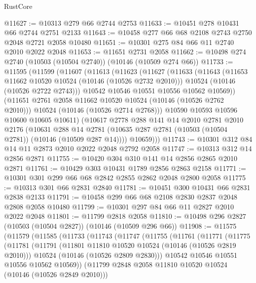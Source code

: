 \begin{lexlean}{RustCore}
\begin{coremodule}
@11627 := @10313 @279 @66 @2744 @2753
@11633 := @10451 @278 @10431 @66 @2744 @2751 @2133
@11643 := @10458 @277 @66 @68 @2108 @2743 @2750 @2048 @2721 @2058 @10480
@11651 := @10301 @275 @84 @66 @11 @2740 @2010 @2022 @2048
@11653 := @11651 @2731 @2058
@11662 := @10498 @274 @2740 (@10503 (@10504 @2740)) (@10146 (@10509 @274 @66))
@11733 := @11595
    (@11599
      (@11607
        (@11613
          (@11623
            (@11627
              (@11633
                (@11643
                  (@11653 @11662 @10520 @10524 (@10146 (@10526 @2732 @2010)))
                  @10524
                  (@10146 (@10526 @2722 @2743)))
                @10542
                @10546
                @10551
                @10556
                @10562
                @10569))
            (@11651 @2761 @2058 @11662 @10520 @10524 (@10146 (@10526 @2762 @2010)))
            @10524
            (@10146 (@10526 @2714 @2768)))
          @10590
          @10593
          @10596
          @10600
          @10605
          @10611)
        (@10617
          @2778
          @288
          @141
          @14
          @2010
          @2781
          @2010
          @2176
          (@10631
            @288
            @14
            @2781
            (@10635 @287 @2781 (@10503 (@10504 @2781)) (@10146 (@10509 @287 @14))))
          @10659)))
@11743 := @10301 @312 @84 @14 @11 @2873 @2010 @2022 @2048 @2792 @2058
@11747 := @10313 @312 @14 @2856 @2871
@11755 := @10420 @304 @310 @141 @14 @2856 @2865 @2010 @2871
@11761 := @10429 @303 @10431 @1789 @2856 @2863 @2158
@11771 := @10301 @301 @299 @66 @68 @2842 @2855 @2862 @2048 @2800 @2058
@11775 := @10313 @301 @66 @2831 @2840
@11781 := @10451 @300 @10431 @66 @2831 @2838 @2133
@11791 := @10458 @299 @66 @68 @2108 @2830 @2837 @2048 @2808 @2058 @10480
@11799 := @10301 @297 @84 @66 @11 @2827 @2010 @2022 @2048
@11801 := @11799 @2818 @2058
@11810 := @10498 @296 @2827 (@10503 (@10504 @2827)) (@10146 (@10509 @296 @66))
@11908 := @11575
    (@11579
      (@11585
        (@11733
          (@11743
            (@11747
              (@11755
                (@11761
                  (@11771
                    (@11775
                      (@11781
                        (@11791
                          (@11801 @11810 @10520 @10524 (@10146 (@10526 @2819 @2010)))
                          @10524
                          (@10146 (@10526 @2809 @2830)))
                        @10542
                        @10546
                        @10551
                        @10556
                        @10562
                        @10569))
                    (@11799 @2848 @2058 @11810 @10520 @10524 (@10146 (@10526 @2849 @2010)))

\end{coremodule}
\end{lexlean}
